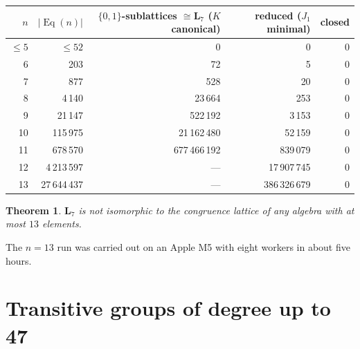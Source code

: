 \documentclass[11pt]{article}
\newtheorem{theorem}{Theorem}
\theoremstyle{remark}
\newcommand{\Eq}{\operatorname{Eq}}
\newcommand{\LL}{\mathbf{L}_7}
\begin{document}
\begin{center}
\begin{tabular}{rrrrr}
\toprule
$n$ & $|\Eq(n)|$ & $\{0,1\}$-sublattices $\cong\LL$ ($K$ canonical) & reduced ($J_1$ minimal) & closed\\
\midrule
$\le 5$ & $\le 52$ & 0 & 0 & 0\\
6 & 203 & 72 & 5 & 0\\
7 & 877 & 528 & 20 & 0\\
8 & 4\,140 & 23\,664 & 253 & 0\\
9 & 21\,147 & 522\,192 & 3\,153 & 0\\
10 & 115\,975 & 21\,162\,480 & 52\,159 & 0\\
11 & 678\,570 & 677\,466\,192 & 839\,079 & 0\\
12 & 4\,213\,597 & --- & 17\,907\,745 & 0\\
13 & 27\,644\,437 & --- & 386\,326\,679 & 0\\
\bottomrule
\end{tabular}
\end{center}

\begin{theorem}\label{thm:brute}
$\LL$ is not isomorphic to the congruence lattice of any algebra with at most $13$ elements.
\end{theorem}

The $n=13$ run was carried out on an Apple M5 with eight workers in about five hours.

\section{Transitive groups of degree up to 47}
\end{document}
